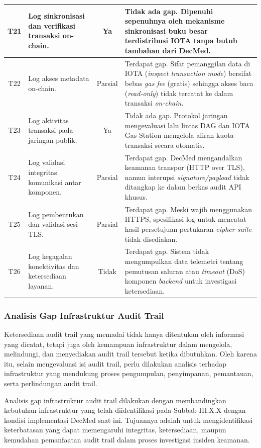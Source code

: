 \begin{xltabular}{\textwidth}{|c|>{\raggedright\arraybackslash}X|c|p{6cm}|}
    \hline
    T21 & Log sinkronisasi dan verifikasi transaksi on-chain. & Ya & Tidak ada gap. Dipenuhi sepenuhnya oleh mekanisme sinkronisasi buku besar terdistribusi IOTA tanpa butuh tambahan dari DecMed. \\
    \hline
    T22 & Log akses metadata on-chain. & Parsial & Terdapat gap. Sifat pemanggilan data di IOTA (\textit{inspect transaction mode}) bersifat bebas \textit{gas fee} (gratis) sehingga akses baca (\textit{read-only}) tidak tercatat ke dalam transaksi \textit{on-chain}. \\
    \hline
    T23 & Log aktivitas transaksi pada jaringan publik. & Ya & Tidak ada gap. Protokol jaringan mengevaluasi lalu lintas DAG dan IOTA Gas Station mengelola aliran kuota transaksi secara otomatis. \\
    \hline
    T24 & Log validasi integritas komunikasi antar komponen. & Parsial & Terdapat gap. DecMed mengandalkan keamanan transpor (HTTP over TLS), namun interupsi \textit{signature/payload} tidak ditangkap ke dalam berkas audit API khusus. \\
    \hline
    T25 & Log pembentukan dan validasi sesi TLS. & Parsial & Terdapat gap. Meski wajib menggunakan HTTPS, spesifikasi log untuk mencatat hasil persetujuan pertukaran \textit{cipher suite} tidak disediakan. \\
    \hline
    T26 & Log kegagalan konektivitas dan ketersediaan layanan. & Tidak & Terdapat gap. Sistem tidak mengumpulkan data telemetri tentang pemutusan saluran atau \textit{timeout} (DoS) komponen \textit{backend} untuk investigasi ketersediaan. \\
    \hline

\end{xltabular}

\subsubsection{Analisis Gap Infrastruktur Audit Trail}

Ketersediaan audit trail yang memadai tidak hanya ditentukan oleh informasi yang dicatat, tetapi juga oleh kemampuan infrastruktur dalam mengelola, melindungi, dan menyediakan audit trail tersebut ketika dibutuhkan. Oleh karena itu, selain mengevaluasi isi audit trail, perlu dilakukan analisis terhadap infrastruktur yang mendukung proses pengumpulan, penyimpanan, pemantauan, serta perlindungan audit trail.

Analisis gap infrastruktur audit trail dilakukan dengan membandingkan kebutuhan infrastruktur yang telah diidentifikasi pada Subbab III.X.X dengan kondisi implementasi DecMed saat ini. Tujuannya adalah untuk mengidentifikasi keterbatasan yang dapat memengaruhi integritas, ketersediaan, maupun kemudahan pemanfaatan audit trail dalam proses investigasi insiden keamanan.

